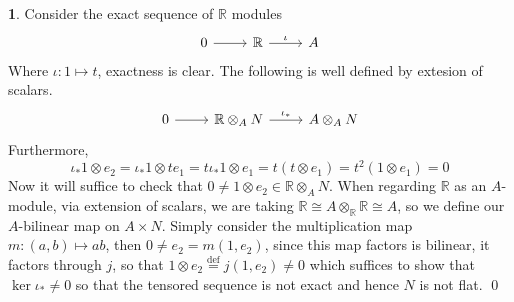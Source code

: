\documentclass[11pt]{article}
\theoremstyle{definition}
\newtheorem{pb}{}
\begin{document}
    \begin{pb}
        Consider the exact sequence of \(\mathbb{R}\) modules
        \begin{equation*}
            \begin{tikzcd}
                0 \arrow[r,"{}"] &\mathbb{R} \arrow[r,"{\iota}"] & A
            \end{tikzcd}
        \end{equation*}
        Where \(\iota: 1\mapsto t\), exactness is clear. The following is well defined by extesion of scalars.
        \begin{equation*}
            \begin{tikzcd}
                0 \arrow[r,"{}"] &\mathbb{R}\otimes_A N \arrow[r,"{\iota_*}"] &A \otimes_A N
            \end{tikzcd}
        \end{equation*}
        Furthermore, \[\iota_* 1 \otimes e_2 = \iota_*1\otimes te_1 = t\iota_*1\otimes e_1 = t(t \otimes e_1) = t^2(1 \otimes e_1) = 0\]
        Now it will suffice to check that \(0 \neq 1 \otimes e_2 \in \mathbb{R} \otimes_A N\). When regarding \(\mathbb{R}\) as an \(A\)-module, via extension of scalars, we are taking \(\mathbb{R} \cong A \otimes_\mathbb{R} \mathbb{R} \cong A\), so we define our \(A\)-bilinear map on \(A \times N\). Simply consider the multiplication map \(m:(a,b) \mapsto ab\), then \(0 \neq e_2 = m(1,e_2)\), since this map factors is bilinear, it factors through \(j\), so that \(1 \otimes e_2 \overset{\text{def}}{=} j(1,e_2) \neq 0\) which suffices to show that \(\ker \iota_* \neq 0\) so that the tensored sequence is not exact and hence \(N\) is not flat. \qed
    \end{pb}
\end{document}
